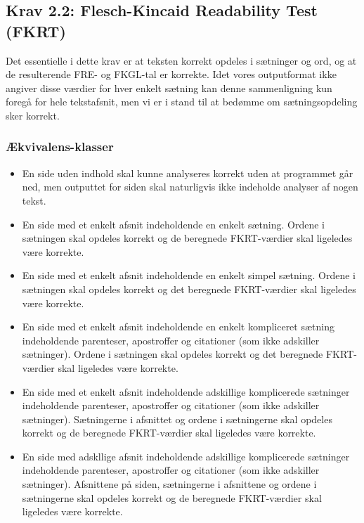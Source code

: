\documentclass[a4paper,oneside,article]{memoir}
\begin{document}
\subsection{Krav 2.2: Flesch-Kincaid Readability Test (FKRT)}

Det essentielle i dette krav er at teksten korrekt opdeles i sætninger
og ord, og at de resulterende FRE- og FKGL-tal er korrekte. Idet vores
outputformat ikke angiver disse værdier for hver enkelt sætning kan
denne sammenligning kun foregå for hele tekstafsnit, men vi er i stand
til at bedømme om sætningsopdeling sker korrekt.

\subsubsection{Ækvivalens-klasser}
\begin{itemize}
\item En side uden indhold skal kunne analyseres korrekt uden at
  programmet går ned, men outputtet for siden skal naturligvis ikke
  indeholde analyser af nogen tekst.
\item En side med et enkelt afsnit indeholdende en enkelt
  sætning. Ordene i sætningen skal opdeles korrekt og de beregnede
  FKRT-værdier skal ligeledes være korrekte.
\item En side med et enkelt afsnit indeholdende en enkelt simpel
  sætning. Ordene i sætningen skal opdeles korrekt og det beregnede
  FKRT-værdier skal ligeledes være korrekte.
\item En side med et enkelt afsnit indeholdende en enkelt kompliceret
  sætning indeholdende parenteser, apostroffer og citationer (som ikke
  adskiller sætninger). Ordene i sætningen skal opdeles korrekt og det
  beregnede FKRT-værdier skal ligeledes være korrekte.
\item En side med et enkelt afsnit indeholdende adskillige
  komplicerede sætninger indeholdende parenteser, apostroffer og
  citationer (som ikke adskiller sætninger). Sætningerne i afsnittet
  og ordene i sætningerne skal opdeles korrekt og de beregnede
  FKRT-værdier skal ligeledes være korrekte.
\item En side med adskllige afsnit indeholdende adskillige
  komplicerede sætninger indeholdende parenteser, apostroffer og
  citationer (som ikke adskiller sætninger). Afsnittene på siden,
  sætningerne i afsnittene og ordene i sætningerne skal opdeles
  korrekt og de beregnede FKRT-værdier skal ligeledes være korrekte.
\end{itemize}
\end{document}
